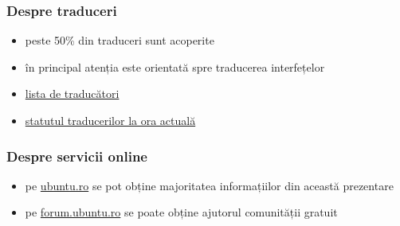 \documentclass[compress]{beamer}
\begin{document}
\begin{frame}
\frametitle{Despre traduceri}

\begin{itemize}[<+->]
  \item peste 50\% din traduceri sunt acoperite
  \item în principal atenția este orientată spre traducerea interfețelor
  \item \href{https://launchpad.net/~ubuntu-ro/+members}{lista de traducători}
  \item \href{https://translations.launchpad.net/ubuntu/quantal/+lang/ro}{statutul traducerilor la ora actuală}
\end{itemize}
\end{frame}

\begin{frame}
\frametitle{Despre servicii online}

\begin{itemize}[<+->]
  \item pe \href{http://ubuntu.ro}{ubuntu.ro} se pot obține majoritatea informațiilor din această prezentare
  \item pe \href{http://forum.ubuntu.ro}{forum.ubuntu.ro} se poate obține ajutorul comunității gratuit

\end{itemize}
\end{frame}
\end{document}
